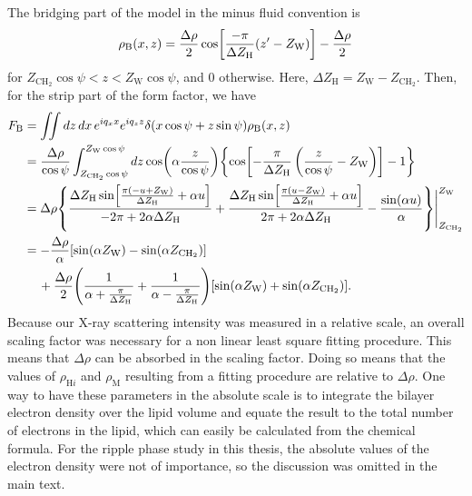 \documentclass[12pt,letterpaper]{article}
\newcommand{\dx}{\mathop{dx}}
\newcommand{\dz}{\mathop{dz}}
\newcommand{\zw}{Z_\mathrm{W}}
\newcommand{\zchtwo}{Z_\mathrm{CH_2}}
\newcommand{\rhoh}[1]{\rho_{\mathrm{H}#1}}
\newcommand{\rhom}{\rho_\mathrm{M}}
\newcommand{\rhob}{\rho_\mathrm{B}}
\newcommand{\deltazh}{\Delta Z_\mathrm{H}}
\begin{document}
The bridging part of the model in the minus fluid convention is 
\begin{align}
  \rhob(x,z) = \frac{\Delta\rho}{2} \cos \bracks{
    \frac{-\pi}{\deltazh}(z'-\zw)} - \frac{\Delta\rho}{2}
\end{align}
for $\zchtwo\cos\psi < z < \zw\cos\psi$, and 0 otherwise. Here,
$\deltazh=\zw-\zchtwo$.
Then, for the strip part of the form factor, we have
\begin{align}
  F_\mathrm{B} 
  &= \iint\dz\dx e^{iq_xx}e^{iq_zz} \delta(x\cos\psi+z\sin\psi) \rhob(x,z) \nonumber\\
  &= \frac{\Delta\rho}{\cos\psi}
     \int_{\zchtwo\cos\psi}^{\zw\cos\psi}\dz \cos\pars{\alpha\frac{z}{\cos\psi}} 
     \braces{\cos\bracks{-\frac{\pi}{\deltazh}\left(\frac{z}{\cos\psi}-\zw\right)} - 1} \nonumber\\
  &= \Delta\rho \braces{
       \frac{\deltazh\sin\bracks{\frac{\pi(-u+\zw)}{\deltazh}+\alpha u}}{-2\pi+2\alpha\deltazh}
       + \frac{\deltazh\sin\bracks{\frac{\pi(u-\zw)}{\deltazh}+\alpha u}}{2\pi+2\alpha\deltazh}
       - \frac{\sin(\alpha u)}{\alpha}  
     }\Bigg|_{\zchtwo}^{\zw} \nonumber\\
  &= -\frac{\Delta\rho}{\alpha}\bracks{\sin(\alpha\zw)-\sin(\alpha\zchtwo)} \nonumber\\
  & \,\quad + \frac{\Delta\rho}{2} \pars{
      \frac{1}{\alpha+\frac{\pi}{\deltazh}} 
      + \frac{1}{\alpha-\frac{\pi}{\deltazh}}
    }\bracks{\sin(\alpha\zw)+\sin(\alpha\zchtwo)}.
\end{align}
Because our X-ray scattering intensity was measured in a relative scale, 
an overall scaling factor was necessary for a non linear least square 
fitting procedure. This means that $\Delta\rho$ can be absorbed in the 
scaling factor. Doing so means that the values of $\rhoh{i}$ and $\rhom$
resulting from a fitting procedure are relative to $\Delta\rho$. One way 
to have these parameters in the absolute scale is to integrate the 
bilayer electron density over the lipid volume and equate the result
to the total number of electrons in the lipid, which can easily be calculated
from the chemical formula. For the ripple phase study in this thesis, the
absolute values of the electron density were not of importance, so the
discussion was omitted in the main text.


\end{document}
